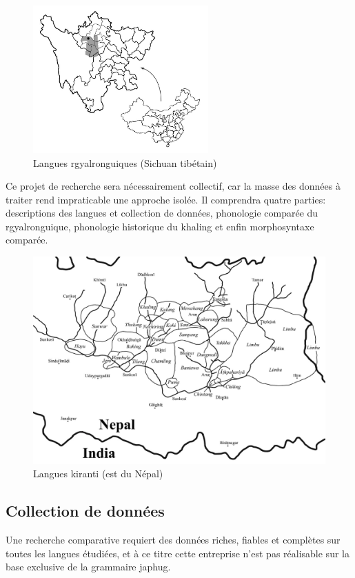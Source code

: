 \documentclass[oldfontcommands,oneside,a4paper,11pt]{article}
\begin{document}
   \begin{figure}[h]
   \caption{Langues rgyalronguiques (Sichuan tibétain) }  \label{fig:rgy}  \centering
 \includegraphics[width=0.6\textwidth]{carte.JPG}
 \end{figure}
Ce projet de recherche sera nécessairement collectif, car la masse des données à traiter rend impraticable une approche isolée. Il comprendra quatre parties: descriptions des langues et collection de données, phonologie comparée du rgyalronguique, phonologie historique du khaling et enfin morphosyntaxe comparée.

 \begin{figure}[h]
   \caption{Langues kiranti (est du Népal)} \label{fig:kirant}   \centering
  \includegraphics[width=\textwidth]{Kirant.jpeg} 
 \end{figure}
 
\subsection{Collection de données}
Une recherche comparative requiert des données riches, fiables et complètes sur toutes les langues étudiées, et à ce titre cette entreprise n'est pas réalisable sur la base exclusive de la grammaire japhug.
\end{document}
